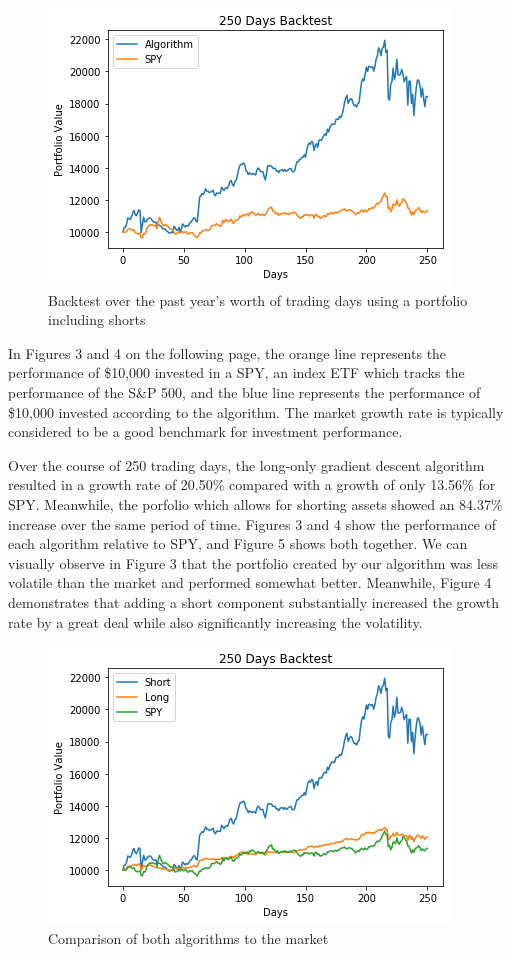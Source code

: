 \documentclass{article}
\begin{document}
\begin{figure}[h!]%
\includegraphics[scale=0.9]{back2}
\caption{Backtest over the past year's worth of trading days using a portfolio including shorts}
\end{figure}

In Figures 3 and 4 on the following page, the orange line represents the performance of \$10,000 invested in a SPY, an index ETF which tracks the performance of the S\&P 500, and the blue line represents the performance of \$10,000 invested according to the algorithm.  The market growth rate is typically considered to be a good benchmark for investment performance.

Over the course of 250 trading days, the long-only gradient descent algorithm resulted in a growth rate of 20.50\% compared with a growth of only 13.56\% for SPY.  Meanwhile, the porfolio which allows for shorting assets showed an 84.37\% increase over the same period of time.  Figures 3 and 4 show the performance of each algorithm relative to SPY, and Figure 5 shows both together.  We can visually observe in Figure 3 that the portfolio created by our algorithm was less volatile than the market and performed somewhat better.  Meanwhile, Figure 4 demonstrates that adding a short component substantially increased the growth rate by a great deal while also significantly increasing the volatility.

\begin{figure}[h!]%
\includegraphics[scale=0.9]{back3}
\caption{Comparison of both algorithms to the market}
\end{figure}
\end{document}
